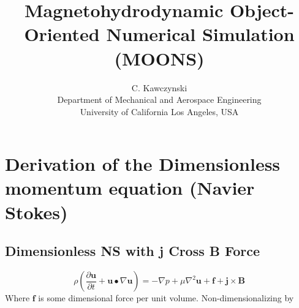 \documentclass[11pt]{article}
\begin{document}
\doublespacing
\title{Magnetohydrodynamic Object-Oriented Numerical Simulation (MOONS)}
\author{C. Kawczynski \\
Department of Mechanical and Aerospace Engineering \\
University of California Los Angeles, USA\\
}
\maketitle

\section{Derivation of the Dimensionless momentum equation (Navier Stokes)}
\subsection{Dimensionless NS with j Cross B Force}
\begin{equation}
	\rho \left( \frac{\partial \pmb{u}}{\partial t} + \pmb{u} \bullet \nabla \pmb{u} \right) = 
	-\nabla p + \mu \nabla^2 \pmb{u} + \pmb{f} + \pmb{j} \times \pmb{B}
\end{equation}
Where $\pmb{f}$ is some dimensional force per unit volume. Non-dimensionalizing by
\end{document}
